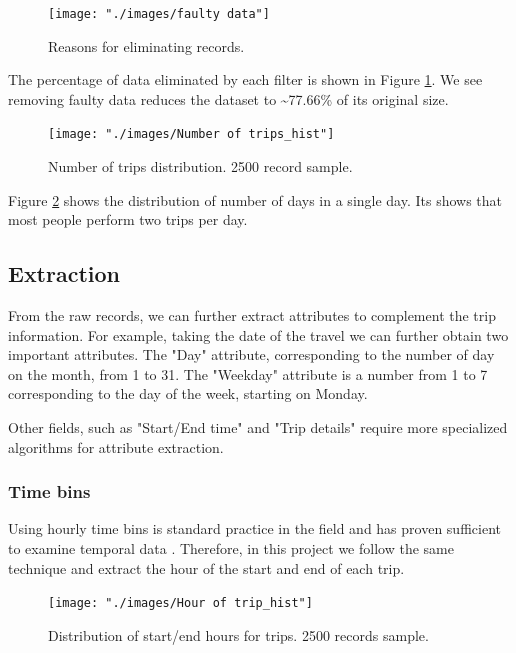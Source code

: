 \documentclass{article}
\begin{document}
\begin{figure}[H]
  \centering
  \texttt{[image: "./images/faulty data"]} %
  \caption{Reasons for eliminating records.}
  \label{fig:preprocessing/faulty}
\end{figure}

The percentage of data eliminated by each filter is shown in Figure \ref{fig:preprocessing/faulty}. We see removing faulty data reduces the dataset to \textasciitilde 77.66\% of its original size. 

\begin{figure}[H]
  \centering
  \texttt{[image: "./images/Number of trips\_hist"]}
  \caption{Number of trips distribution. 2500 record sample.}
  \label{fig:preprocessing/num_trips}
\end{figure}

Figure \ref{fig:preprocessing/num_trips} shows the distribution of number of days in a single day. Its shows that most people perform two trips per day. %

\subsection{Extraction}
From the raw records, we can further extract attributes to complement the trip information. For example, taking the date of the travel we can further obtain two important attributes. The "Day" attribute, corresponding to the number of day on the month, from 1 to 31. The "Weekday" attribute is a number from 1 to 7 corresponding to the day of the week, starting on Monday.

Other fields, such as "Start/End time" and "Trip details" require more specialized algorithms for attribute extraction.

\subsubsection{Time bins}
Using hourly time bins is standard practice in the field and has proven sufficient to examine temporal data \cite{langlois2016inferring} \cite{ma2017understanding} \cite{morency2007measuring}. Therefore, in this project we follow the same technique and extract the hour of the start and end of each trip.

\begin{figure}[H]
  \centering
  \texttt{[image: "./images/Hour of trip\_hist"]}
  \caption{Distribution of start/end hours for trips. 2500 records sample.}
  \label{fig:preprocessing/start_end_hour}%
\end{figure}
\end{document}
